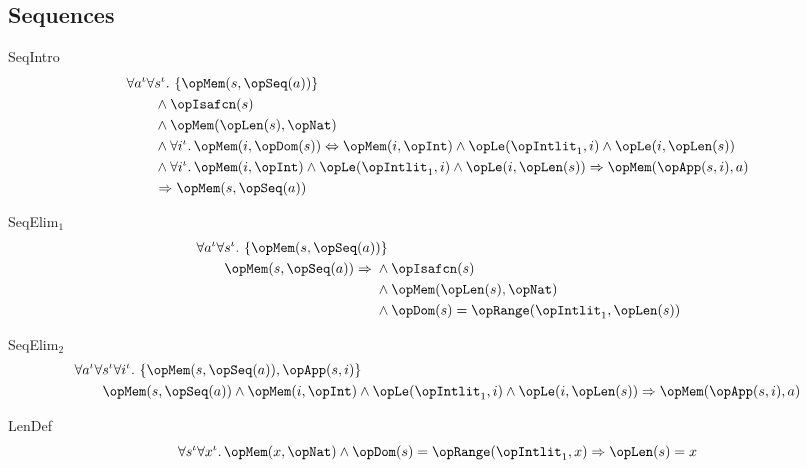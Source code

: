 \documentclass[11pt, a4paper, oneside]{article}
\begin{document}
    \subsection{Sequences}
    \label{subsec:seqs}

\begin{axioms}
\item[SeqIntro] \[
        \begin{aligned}
            &\forall a^\idv \forall s^\idv.\, \st{ \opMem(s, \opSeq(a)) } \\
            &\qquad \wedge \opIsafcn(s) \\
            &\qquad \wedge \opMem(\opLen(s), \opNat) \\
            &\qquad \wedge \forall i^\idv.\, \opMem(i, \opDom(s)) \eqv \opMem(i, \opInt) \wedge \opLe(\opIntlit_1, i) \wedge \opLe(i, \opLen(s)) \\
            &\qquad \wedge \forall i^\idv.\, \opMem(i, \opInt) \wedge \opLe(\opIntlit_1, i) \wedge \opLe(i, \opLen(s)) \imp \opMem(\opApp(s, i), a) \\
            &\qquad \imp \opMem(s, \opSeq(a))
        \end{aligned}
    \]

\item[SeqElim$_1$] \[
        \begin{aligned}
            &\forall a^\idv \forall s^\idv.\, \st{ \opMem(s, \opSeq(a)) } \\
            &\qquad \opMem(s, \opSeq(a)) \imp \begin{aligned}[t]
                &\wedge \opIsafcn(s) \\
                &\wedge \opMem(\opLen(s), \opNat) \\
                &\wedge \opDom(s) = \opRange(\opIntlit_1, \opLen(s))
            \end{aligned}
        \end{aligned}
    \]

\item[SeqElim$_2$] \[
        \begin{aligned}
            &\forall a^\idv \forall s^\idv \forall i^\idv.\, \st{ \opMem(s, \opSeq(a)), \opApp(s, i) } \\
            &\qquad \opMem(s, \opSeq(a)) \wedge \opMem(i, \opInt) \wedge \opLe(\opIntlit_1, i) \wedge \opLe(i, \opLen(s)) \imp \opMem(\opApp(s, i), a)
        \end{aligned}
    \]

\item[LenDef] \[
        \forall s^\idv \forall x^\idv.\, \opMem(x, \opNat) \wedge \opDom(s) = \opRange(\opIntlit_1, x) \imp \opLen(s) = x
    \]


\end{axioms}
\end{document}
